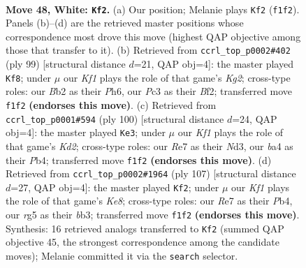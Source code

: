 \documentclass[11pt]{article}
\begin{document}
\clearpage

\begin{figure}[p]\centering
\begin{subfigure}{0.46\textwidth}\centering
\resizebox{\linewidth}{!}{%
\newchessgame
\chessboard[
  setfen={6k1/4R3/8/pp4r1/b1p5/P1P5/1B6/5K2 w - - 2 48},
  showmover=false,
  pgfstyle=straightmove, color=movearrow, markmove={f1-f2}
]}
\caption{}
\end{subfigure}\hfill
\begin{subfigure}{0.46\textwidth}\centering
\resizebox{\linewidth}{!}{%
\newchessgame
\chessboard[
  setfen={8/4r1k1/7p/1R3K2/7p/5B1P/5bP1/8 b - - 26 50},
  showmover=false,
  pgfstyle=straightmove, color=movearrow, markmove={g7-f8}
]}
\caption{}
\end{subfigure}
\\[4pt]
\begin{subfigure}{0.46\textwidth}\centering
\resizebox{\linewidth}{!}{%
\newchessgame
\chessboard[
  setfen={5k2/2R5/p3pr2/1p1b4/1P6/P2N4/3K4/8 w - - 0 51},
  showmover=false,
  pgfstyle=straightmove, color=movearrow, markmove={d2-e3}
]}
\caption{}
\end{subfigure}\hfill
\begin{subfigure}{0.46\textwidth}\centering
\resizebox{\linewidth}{!}{%
\newchessgame
\chessboard[
  setfen={8/8/7p/6bP/1p3pP1/1B3P1K/P7/4k3 b - - 12 54},
  showmover=false,
  pgfstyle=straightmove, color=movearrow, markmove={e1-f2}
]}
\caption{}
\end{subfigure}
\caption{\textbf{Move 48, White: \texttt{Kf2}.} (a) Our position; Melanie plays \texttt{Kf2} (\texttt{f1f2}). Panels (b)--(d) are the retrieved master positions whose correspondence most drove this move (highest QAP objective among those that transfer to it). (b) Retrieved from \texttt{ccrl\_top\_p0002\#402} (ply 99) [structural distance $d$=21, QAP obj=4]: the master played \texttt{Kf8}; under $\mu$ our \emph{Kf1} plays the role of that game's \emph{Kg2}; cross-type roles: our \emph{B}b2 as their \emph{P}h6, our \emph{P}c3 as their \emph{B}f2; transferred move \texttt{f1f2} \textbf{(endorses this move)}. (c) Retrieved from \texttt{ccrl\_top\_p0001\#594} (ply 100) [structural distance $d$=24, QAP obj=4]: the master played \texttt{Ke3}; under $\mu$ our \emph{Kf1} plays the role of that game's \emph{Kd2}; cross-type roles: our \emph{R}e7 as their \emph{N}d3, our \emph{b}a4 as their \emph{P}b4; transferred move \texttt{f1f2} \textbf{(endorses this move)}. (d) Retrieved from \texttt{ccrl\_top\_p0002\#1964} (ply 107) [structural distance $d$=27, QAP obj=4]: the master played \texttt{Kf2}; under $\mu$ our \emph{Kf1} plays the role of that game's \emph{Ke8}; cross-type roles: our \emph{R}e7 as their \emph{P}b4, our \emph{r}g5 as their \emph{b}b3; transferred move \texttt{f1f2} \textbf{(endorses this move)}. Synthesis: 16 retrieved analogs transferred to \texttt{Kf2} (summed QAP objective 45, the strongest correspondence among the candidate moves); Melanie committed it via the \texttt{search} selector.}
\label{fig:thought-m94}
\end{figure}
\end{document}
